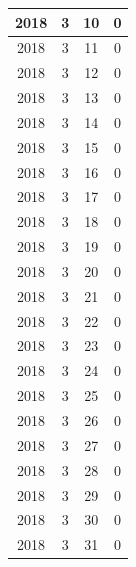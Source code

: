 \begin{longtable} {|c|c|c|c|}
\hline
2018         & 3            & 10           & 0                         \\ 
\hline
2018         & 3            & 11           & 0                         \\ 
\hline
2018         & 3            & 12           & 0                         \\ 
\hline
2018         & 3            & 13           & 0                         \\ 
\hline
2018         & 3            & 14           & 0                         \\ 
\hline
2018         & 3            & 15           & 0                         \\ 
\hline
2018         & 3            & 16           & 0                         \\ 
\hline
2018         & 3            & 17           & 0                         \\ 
\hline
2018         & 3            & 18           & 0                         \\ 
\hline
2018         & 3            & 19           & 0                         \\ 
\hline
2018         & 3            & 20           & 0                         \\ 
\hline
2018         & 3            & 21           & 0                         \\ 
\hline
2018         & 3            & 22           & 0                         \\ 
\hline
2018         & 3            & 23           & 0                         \\ 
\hline
2018         & 3            & 24           & 0                         \\ 
\hline
2018         & 3            & 25           & 0                         \\ 
\hline
2018         & 3            & 26           & 0                         \\ 
\hline
2018         & 3            & 27           & 0                         \\ 
\hline
2018         & 3            & 28           & 0                         \\ 
\hline
2018         & 3            & 29           & 0                         \\ 
\hline
2018         & 3            & 30           & 0                         \\ 
\hline
2018         & 3            & 31           & 0                         \\ 

\end{longtable}
